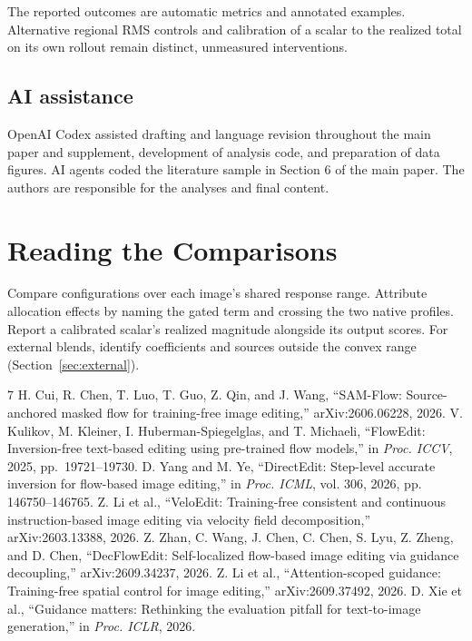 \documentclass[10pt,doubleanonymous]{ieeeconf}
\begin{document}
The reported outcomes are automatic metrics and annotated examples. Alternative regional RMS controls and calibration of a scalar to the realized total on its own rollout remain distinct, unmeasured interventions.

\subsection{AI assistance}
OpenAI Codex assisted drafting and language revision throughout the main paper and supplement, development of analysis code, and preparation of data figures. AI agents coded the literature sample in Section 6 of the main paper. The authors are responsible for the analyses and final content.


\section{Reading the Comparisons}\label{sec:decision-guide}
Compare configurations over each image's shared response range. Attribute allocation effects by naming the gated term and crossing the two native profiles. Report a calibrated scalar's realized magnitude alongside its output scores. For external blends, identify coefficients and sources outside the convex range (Section~\ref{sec:external}).

\begin{thebibliography}{7}
H. Cui, R. Chen, T. Luo, T. Guo, Z. Qin, and J. Wang, 
``SAM-Flow: Source-anchored masked flow for training-free image editing,'' arXiv:2606.06228, 2026.
V. Kulikov, M. Kleiner, I. Huberman-Spiegelglas, and T. Michaeli,
``FlowEdit: Inversion-free text-based editing using pre-trained flow models,'' in \emph{Proc. ICCV}, 2025, pp.~19721--19730.
D. Yang and M. Ye,
``DirectEdit: Step-level accurate inversion for flow-based image editing,''
in \emph{Proc. ICML}, vol. 306, 2026, pp. 146750--146765.
Z. Li et al., ``VeloEdit: Training-free consistent and continuous instruction-based image editing via velocity field decomposition,'' arXiv:2603.13388, 2026.
Z. Zhan, C. Wang, J. Chen, C. Chen, S. Lyu, Z. Zheng, and D. Chen, ``DecFlowEdit: Self-localized flow-based image editing via guidance decoupling,'' arXiv:2609.34237, 2026.
Z. Li et al., ``Attention-scoped guidance: Training-free spatial control for image editing,'' arXiv:2609.37492, 2026.
D. Xie et al., ``Guidance matters: Rethinking the evaluation pitfall for text-to-image generation,'' in \emph{Proc. ICLR}, 2026.
\end{thebibliography}
\end{document}
